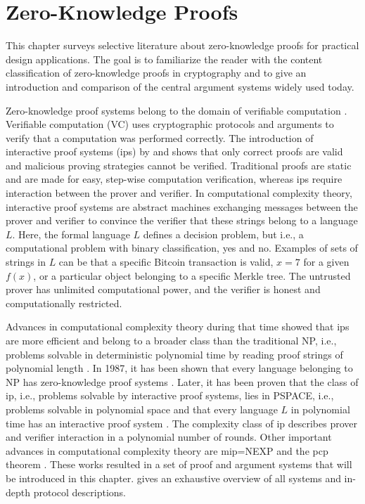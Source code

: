 \chapter{Zero-Knowledge Proofs}
This chapter surveys selective literature about zero-knowledge proofs for practical design applications. The goal is to familiarize the reader with the content classification of zero-knowledge proofs in cryptography and to give an introduction and comparison of the central argument systems widely used today. 

Zero-knowledge proof systems belong to the domain of verifiable computation \citep{Simunic, Ahmad}. Verifiable computation (VC) uses cryptographic protocols and arguments to verify that a computation was performed correctly. The introduction of interactive proof systems (\acrshort{ip}s) by \citet{GoldwasserIPs} and \citet{BabaiIPs} shows that only correct proofs are valid and malicious proving strategies cannot be verified. Traditional proofs are static and are made for easy, step-wise computation verification, whereas \acrshort{ip}s require interaction between the prover and verifier. In computational complexity theory, interactive proof systems are abstract machines exchanging messages between the prover and verifier to convince the verifier that these strings belong to a language \(L\). Here, the formal language \(L\) defines a decision problem, but i.e., a computational problem with binary classification, yes and no. Examples of sets of strings in \(L\) can be that a specific Bitcoin transaction is valid, \(x = 7\) for a given \(f(x)\), or a particular object belonging to a specific Merkle tree. The untrusted prover has unlimited computational power, and the verifier is honest and computationally restricted. 

Advances in computational complexity theory during that time showed that \acrshort{ip}s are more efficient and belong to a broader class than the traditional NP, i.e., problems solvable in deterministic polynomial time by reading proof strings of polynomial length \citep{IOPsdisc}. In 1987, it has been shown that every language belonging to NP has zero-knowledge proof systems \citep{anymental10.1145/28395.28420}. Later, it has been proven that the class of \acrshort{ip}, i.e., problems solvable by interactive proof systems, lies in PSPACE, i.e., problems solvable in polynomial space \citep{Shamir10.1145/146585.146609} and that every language \(L\) in polynomial time has an interactive proof system \citep{Lund10.1145/146585.146605}. The complexity class of \acrshort{ip} describes prover and verifier interaction in a polynomial number of rounds. Other important advances in computational complexity theory are \acrshort{mip}=NEXP \citep{Laszlo} and the \acrshort{pcp} theorem \citep{PCPTheorem}. These works resulted in a set of proof and argument systems that will be introduced in this chapter. \citet{Thaler} gives an exhaustive overview of all systems and in-depth protocol descriptions. 

